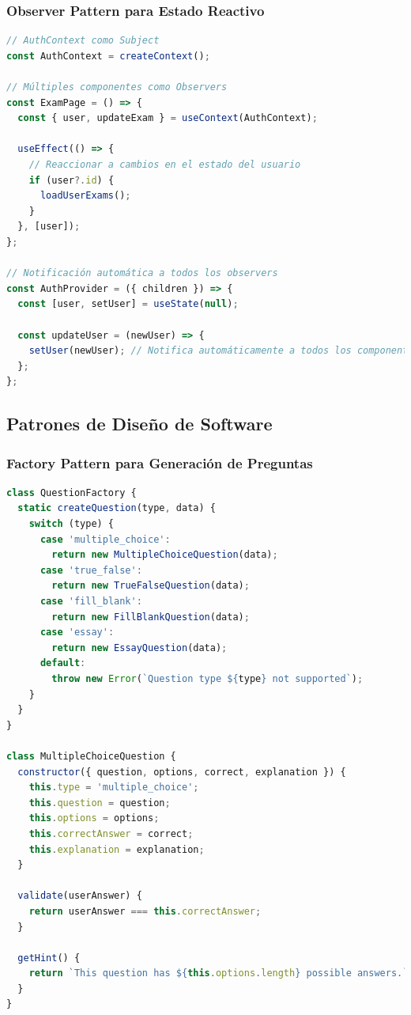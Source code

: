 \documentclass[12pt,a4paper]{report}
\begin{document}
\subsubsection{Observer Pattern para Estado Reactivo}

\begin{lstlisting}[language=JavaScript, caption=Implementación del patrón Observer con Context API]
// AuthContext como Subject
const AuthContext = createContext();

// Múltiples componentes como Observers
const ExamPage = () => {
  const { user, updateExam } = useContext(AuthContext);
  
  useEffect(() => {
    // Reaccionar a cambios en el estado del usuario
    if (user?.id) {
      loadUserExams();
    }
  }, [user]);
};

// Notificación automática a todos los observers
const AuthProvider = ({ children }) => {
  const [user, setUser] = useState(null);
  
  const updateUser = (newUser) => {
    setUser(newUser); // Notifica automáticamente a todos los componentes
  };
};
\end{lstlisting}

\subsection{Patrones de Diseño de Software}

\subsubsection{Factory Pattern para Generación de Preguntas}

\begin{lstlisting}[language=JavaScript, caption=Factory pattern para diferentes tipos de preguntas]
class QuestionFactory {
  static createQuestion(type, data) {
    switch (type) {
      case 'multiple_choice':
        return new MultipleChoiceQuestion(data);
      case 'true_false':
        return new TrueFalseQuestion(data);
      case 'fill_blank':
        return new FillBlankQuestion(data);
      case 'essay':
        return new EssayQuestion(data);
      default:
        throw new Error(`Question type ${type} not supported`);
    }
  }
}

class MultipleChoiceQuestion {
  constructor({ question, options, correct, explanation }) {
    this.type = 'multiple_choice';
    this.question = question;
    this.options = options;
    this.correctAnswer = correct;
    this.explanation = explanation;
  }
  
  validate(userAnswer) {
    return userAnswer === this.correctAnswer;
  }
  
  getHint() {
    return `This question has ${this.options.length} possible answers.`;
  }
}
\end{lstlisting}
\end{document}

